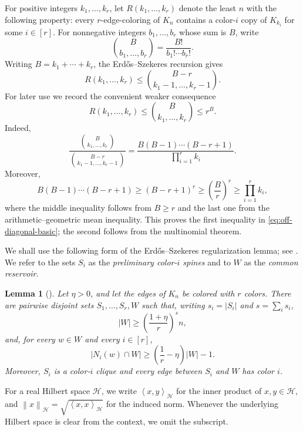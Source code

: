 \documentclass[twoside,12pt]{article}
\newtheorem{lemma}[theorem]{Lemma}
\theoremstyle{definition}
\theoremstyle{remark}
\newcommand{\norm}[1]{\left\lVert #1\right\rVert}
\newcommand{\1}{\mathbf 1}
\newcommand{\ip}[2]{\left\langle #1,#2\right\rangle}
\begin{document}
For positive integers $k_1,\ldots,k_r$, let $R(k_1,\ldots,k_r)$ denote the
least $n$ with the following property: every $r$-edge-coloring of $K_n$
contains a color-$i$ copy of $K_{k_i}$ for some $i\in[r]$. For nonnegative
integers $b_1,\ldots,b_r$ whose sum is $B$, write
\[
 \binom{B}{b_1,\ldots,b_r}=\frac{B!}{b_1!\cdots b_r!}.
\]
Writing $B=k_1+\cdots+k_r$, the Erd\H{o}s--Szekeres recursion gives
\begin{equation}\label{eq:off-diagonal-standard}
 R(k_1,\ldots,k_r)
 \le \binom{B-r}{k_1-1,\ldots,k_r-1}.
\end{equation}
For later use we record the convenient weaker consequence
\begin{equation}\label{eq:off-diagonal-basic}
 R(k_1,\ldots,k_r)
 \le \binom{B}{k_1,\ldots,k_r}
 \le r^B.
\end{equation}
Indeed,
\[
 \frac{\binom{B}{k_1,\ldots,k_r}}
 {\binom{B-r}{k_1-1,\ldots,k_r-1}}
 =\frac{B(B-1)\cdots(B-r+1)}{\prod_{i=1}^r k_i}.
\]
Moreover,
\[
 B(B-1)\cdots(B-r+1)
 \ge(B-r+1)^r
 \ge\left(\frac Br\right)^r
 \ge\prod_{i=1}^r k_i,
\]
where the middle inequality follows from $B\ge r$ and the last one from the
arithmetic--geometric mean inequality. This proves the first inequality in
\eqref{eq:off-diagonal-basic}; the second follows from the multinomial
theorem.

We shall use the following form of the Erd\H{o}s--Szekeres regularization
lemma; see \cite[Lemma~5.2]{BalisterEtAl2026}. We refer to the sets $S_i$ as
the \emph{preliminary color-$i$ spines} and to $W$ as the \emph{common
reservoir}.

\begin{lemma}[\cite{BalisterEtAl2026}]\label{lem:regularization}
Let $\eta>0$, and let the edges of $K_n$ be colored with $r$ colors. There
are pairwise disjoint sets $S_1,\ldots,S_r,W$ such that, writing
$s_i=|S_i|$ and $s=\sum_i s_i$,
\begin{equation}\label{eq:regularization-size}
 |W|\ge\left(\frac{1+\eta}{r}\right)^s n,
\end{equation}
and, for every $w\in W$ and every $i\in[r]$,
\begin{equation}\label{eq:regularization-degree}
 |N_i(w)\cap W|
 \ge\left(\frac1r-\eta\right)|W|-1.
\end{equation}
Moreover, $S_i$ is a color-$i$ clique and every edge between $S_i$ and $W$
has color $i$.
\end{lemma}

For a real Hilbert space $\mathcal H$, we write
$\ip{x}{y}_{\mathcal H}$ for the inner product of $x,y\in\mathcal H$, and
$\norm{x}_{\mathcal H}=\sqrt{\ip{x}{x}_{\mathcal H}}$
for the induced norm. Whenever the underlying Hilbert space is clear from
the context, we omit the subscript.
\end{document}
